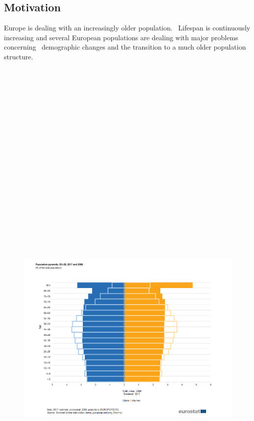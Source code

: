 \subsection{Motivation}
\label{subsec:introduction-motivation}
Europe is dealing with an increasingly older population. \
Lifespan is continuously increasing and several European populations are dealing with major problems concerning \
demographic changes and the transition to a much older population structure.


\begin{figure}[ht]
    \label{fig:eurostat1}
    \includegraphics[width=15cm, height=60cm,keepaspectratio]{img/eurostat1.png}

\end{figure}
